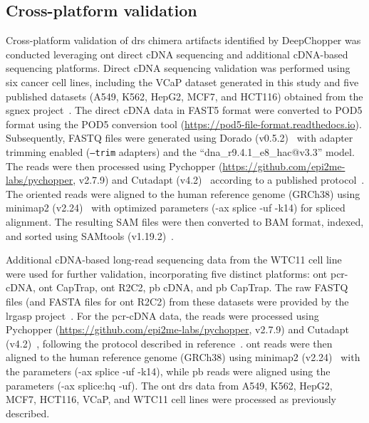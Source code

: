 \documentclass[pdflatex,sn-nature, lineno]{sn-jnl}%
\begin{document}
\subsection{Cross-platform validation}

Cross-platform validation of \gls{drs} chimera artifacts identified by DeepChopper was conducted leveraging \gls{ont} direct cDNA sequencing and additional cDNA-based sequencing platforms.
Direct cDNA sequencing validation was performed using six cancer cell lines, including the VCaP dataset generated in this study and five published datasets (A549, K562, HepG2, MCF7, and HCT116) obtained from the \gls{sgnex} project~\cite{chen2021systematic}.
The direct cDNA data in FAST5 format were converted to POD5 format using the POD5 conversion tool (\url{https://pod5-file-format.readthedocs.io}).
Subsequently, FASTQ files were generated using Dorado (v0.5.2)~\cite{dorado2023} with adapter trimming enabled (\texttt{--trim} adapters) and the ``dna\_r9.4.1\_e8\_hac@v3.3'' model.
The reads were then processed using Pychopper (\url{https://github.com/epi2me-labs/pychopper}, v2.7.9) and Cutadapt (v4.2)~\cite{martin2011cutadapt} according to a published protocol~\cite{grunberger2022nanopore}.
The oriented reads were aligned to the human reference genome (GRCh38) using minimap2 (v2.24)~\cite{li2018minimap2} with optimized parameters (-ax splice -uf -k14) for spliced alignment.
The resulting SAM files were then converted to BAM format, indexed, and sorted using SAMtools (v1.19.2)~\cite{li2009sequence}.

Additional cDNA-based long-read sequencing data from the WTC11 cell line were used for further validation, incorporating five distinct platforms: \gls{ont} \gls{pcr}-cDNA, \gls{ont} CapTrap, \gls{ont} R2C2, \gls{pb} cDNA, and \gls{pb} CapTrap.
The raw FASTQ files (and FASTA files for \gls{ont} R2C2) from these datasets were provided by the \gls{lrgasp} project~\cite{pardo2024systematic}.
For the \gls{pcr}-cDNA data, the reads were processed using Pychopper (\url{https://github.com/epi2me-labs/pychopper}, v2.7.9) and Cutadapt (v4.2)~\cite{martin2011cutadapt}, following the protocol described in reference~\cite{grunberger2022nanopore}. \gls{ont} reads were then aligned to the human reference genome (GRCh38) using minimap2 (v2.24)~\cite{li2018minimap2} with the parameters (-ax splice -uf -k14), while \gls{pb} reads were aligned using the parameters (-ax splice:hq -uf).
The \gls{ont} \gls{drs} data from A549, K562, HepG2, MCF7, HCT116, VCaP, and WTC11 cell lines were processed as previously described.
\end{document}
